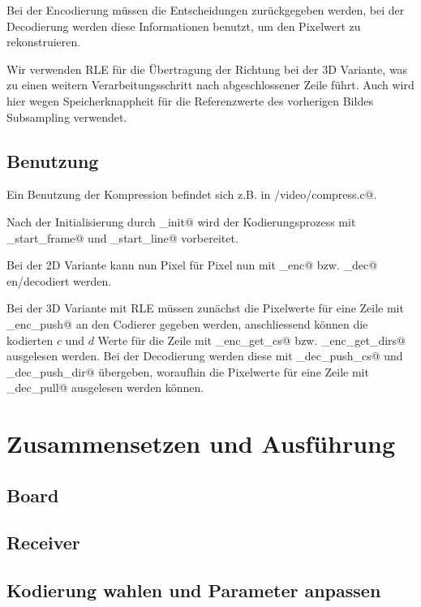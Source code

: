 Bei der Encodierung müssen die Entscheidungen zurückgegeben werden,
bei der Decodierung werden diese Informationen benutzt, um den Pixelwert zu 
rekonstruieren. 

Wir verwenden RLE für die Übertragung der Richtung bei der 3D Variante,
was zu einen weitern Verarbeitungsschritt nach abgeschlossener Zeile führt.
Auch wird hier wegen Speicherknappheit für die Referenzwerte des vorherigen Bildes
Subsampling verwendet.

\subsection{Benutzung}
Ein Benutzung der Kompression befindet sich z.B. in \verb@board/video/compress.c@.

Nach der Initialisierung durch \lstinline@cmpr_init@ 
wird der Kodierungsprozess mit \lstinline@cmpr_start_frame@ und
\lstinline@cmpr_start_line@ vorbereitet.

Bei der 2D Variante kann nun Pixel für Pixel nun mit 
\lstinline@cmpr_enc@ bzw. \lstinline@cmpr_dec@ en/decodiert werden.

Bei der 3D Variante mit RLE müssen zunächst die Pixelwerte für eine Zeile mit
_enc_push@ an den Codierer gegeben werden, anschliessend 
können die kodierten $c$ und $d$ Werte für die Zeile 
mit _enc_get_cs@ bzw. _enc_get_dirs@ ausgelesen werden.
Bei der Decodierung werden diese mit _dec_push_cs@ und 
_dec_push_dir@ übergeben, woraufhin die Pixelwerte
für eine Zeile mit _dec_pull@ ausgelesen werden können.


\section{Zusammensetzen und Ausführung}

\subsection{Board}

\subsection{Receiver}

\subsection{Kodierung wahlen und Parameter anpassen}

